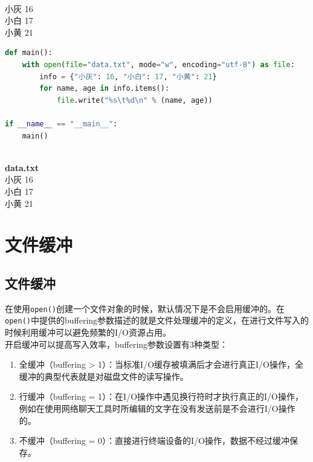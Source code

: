 \begin{tcolorbox}
	 \\
	小灰	16 \\
    小白	17 \\
    小黄	21
\end{tcolorbox}

\begin{lstlisting}[language=Python, title=写入文件]
def main():
    with open(file="data.txt", mode="w", encoding="utf-8") as file:
        info = {"小灰": 16, "小白": 17, "小黄": 21}
        for name, age in info.items():
            file.write("%s\t%d\n" % (name, age))

if __name__ == "__main__":
    main()
\end{lstlisting}

\begin{tcolorbox}
     \\
    \textbf{data.txt} \\
    小灰	16 \\
    小白	17 \\
    小黄	21
\end{tcolorbox}

\newpage

\section{文件缓冲}

\subsection{文件缓冲}

在使用\lstinline|open()|创建一个文件对象的时候，默认情况下是不会启用缓冲的。在\lstinline|open()|中提供的buffering参数描述的就是文件处理缓冲的定义，在进行文件写入的时候利用缓冲可以避免频繁的I/O资源占用。 \\

开启缓冲可以提高写入效率，buffering参数设置有3种类型：

\begin{enumerate}
    \item 全缓冲（buffering > 1）：当标准I/O缓存被填满后才会进行真正I/O操作，全缓冲的典型代表就是对磁盘文件的读写操作。
    
    \item 行缓冲（buffering = 1）：在I/O操作中遇见换行符时才执行真正的I/O操作，例如在使用网络聊天工具时所编辑的文字在没有发送前是不会进行I/O操作的。
    
    \item 不缓冲（buffering = 0）：直接进行终端设备的I/O操作，数据不经过缓冲保存。
\end{enumerate}

